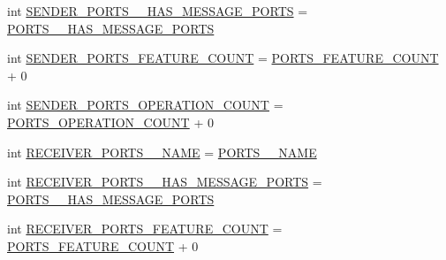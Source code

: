 \begin{DoxyCompactItemize}
int \hyperlink{interfaceshootingmachineemfmodel_1_1_shootingmachineemfmodel_package_a32f9aba86ce59940c62b442308c4bf7d}{S\-E\-N\-D\-E\-R\-\_\-\-P\-O\-R\-T\-S\-\_\-\-\_\-\-H\-A\-S\-\_\-\-M\-E\-S\-S\-A\-G\-E\-\_\-\-P\-O\-R\-T\-S} = \hyperlink{interfaceshootingmachineemfmodel_1_1_shootingmachineemfmodel_package_abfa26d954e44f83dadd22a364a5ede44}{P\-O\-R\-T\-S\-\_\-\-\_\-\-H\-A\-S\-\_\-\-M\-E\-S\-S\-A\-G\-E\-\_\-\-P\-O\-R\-T\-S}
\item 
int \hyperlink{interfaceshootingmachineemfmodel_1_1_shootingmachineemfmodel_package_a9db4c8b36712714f6168acc0e9fae4fa}{S\-E\-N\-D\-E\-R\-\_\-\-P\-O\-R\-T\-S\-\_\-\-F\-E\-A\-T\-U\-R\-E\-\_\-\-C\-O\-U\-N\-T} = \hyperlink{interfaceshootingmachineemfmodel_1_1_shootingmachineemfmodel_package_a1ea63d8ed0fd32dbb04f8c83812629eb}{P\-O\-R\-T\-S\-\_\-\-F\-E\-A\-T\-U\-R\-E\-\_\-\-C\-O\-U\-N\-T} + 0
\item 
int \hyperlink{interfaceshootingmachineemfmodel_1_1_shootingmachineemfmodel_package_ad4c59f12e4631c8b76762f9e81227dce}{S\-E\-N\-D\-E\-R\-\_\-\-P\-O\-R\-T\-S\-\_\-\-O\-P\-E\-R\-A\-T\-I\-O\-N\-\_\-\-C\-O\-U\-N\-T} = \hyperlink{interfaceshootingmachineemfmodel_1_1_shootingmachineemfmodel_package_a566f821cfd14b88ba5e0b60e966fb9f3}{P\-O\-R\-T\-S\-\_\-\-O\-P\-E\-R\-A\-T\-I\-O\-N\-\_\-\-C\-O\-U\-N\-T} + 0
\item 
int \hyperlink{interfaceshootingmachineemfmodel_1_1_shootingmachineemfmodel_package_ac5c4a73f5fdcfd72546565f68e6367b9}{R\-E\-C\-E\-I\-V\-E\-R\-\_\-\-P\-O\-R\-T\-S\-\_\-\-\_\-\-N\-A\-M\-E} = \hyperlink{interfaceshootingmachineemfmodel_1_1_shootingmachineemfmodel_package_a19c316778a7ed9961757b257c512945a}{P\-O\-R\-T\-S\-\_\-\-\_\-\-N\-A\-M\-E}
\item 
int \hyperlink{interfaceshootingmachineemfmodel_1_1_shootingmachineemfmodel_package_a7c53dc7a94983b99dae80e1d58d045c9}{R\-E\-C\-E\-I\-V\-E\-R\-\_\-\-P\-O\-R\-T\-S\-\_\-\-\_\-\-H\-A\-S\-\_\-\-M\-E\-S\-S\-A\-G\-E\-\_\-\-P\-O\-R\-T\-S} = \hyperlink{interfaceshootingmachineemfmodel_1_1_shootingmachineemfmodel_package_abfa26d954e44f83dadd22a364a5ede44}{P\-O\-R\-T\-S\-\_\-\-\_\-\-H\-A\-S\-\_\-\-M\-E\-S\-S\-A\-G\-E\-\_\-\-P\-O\-R\-T\-S}
\item 
int \hyperlink{interfaceshootingmachineemfmodel_1_1_shootingmachineemfmodel_package_adc6b75b7f3724a924c94d2ac5cbbcb58}{R\-E\-C\-E\-I\-V\-E\-R\-\_\-\-P\-O\-R\-T\-S\-\_\-\-F\-E\-A\-T\-U\-R\-E\-\_\-\-C\-O\-U\-N\-T} = \hyperlink{interfaceshootingmachineemfmodel_1_1_shootingmachineemfmodel_package_a1ea63d8ed0fd32dbb04f8c83812629eb}{P\-O\-R\-T\-S\-\_\-\-F\-E\-A\-T\-U\-R\-E\-\_\-\-C\-O\-U\-N\-T} + 0

\end{DoxyCompactItemize}
